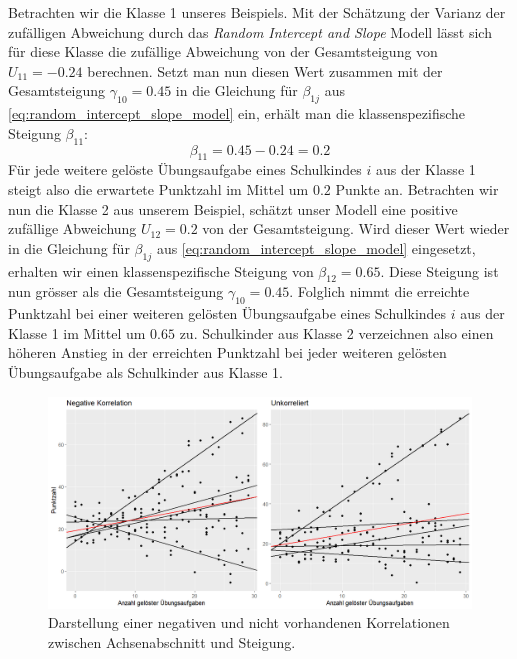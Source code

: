 \documentclass[12pt, a4paper]{article}\usepackage[]{graphicx}\usepackage[]{color}
\begin{document}
Betrachten wir die Klasse 1 unseres Beispiels. Mit der Schätzung der Varianz der zufälligen Abweichung durch das \textit{Random Intercept and Slope} Modell lässt sich für diese Klasse die zufällige Abweichung von der Gesamtsteigung von $U_{11} = -0.24$ berechnen. Setzt man nun diesen Wert zusammen mit der Gesamtsteigung $\gamma_{10} = 0.45$ in die Gleichung für $\beta_{1j}$ aus \eqref{eq:random_intercept_slope_model} ein, erhält man die klassenspezifische Steigung $\beta_{11}$:
\begin{equation} \label{eq:beta1_example}	
\beta_{11} = 0.45 - 0.24 = 0.2
\end{equation} 
Für jede weitere gelöste Übungsaufgabe eines Schulkindes $i$ aus der Klasse 1 steigt also die erwartete Punktzahl im Mittel um $0.2$ Punkte an. Betrachten wir nun die Klasse 2 aus unserem Beispiel, schätzt unser Modell eine positive zufällige Abweichung $U_{12} = 0.2$ von der Gesamtsteigung. Wird dieser Wert wieder in die Gleichung für $\beta_{1j}$ aus \eqref{eq:random_intercept_slope_model} eingesetzt, erhalten wir einen klassenspezifische Steigung von $\beta_{12} = 0.65$. Diese Steigung ist nun grösser als die Gesamtsteigung $\gamma_{10} = 0.45$. Folglich nimmt die erreichte Punktzahl bei einer weiteren gelösten Übungsaufgabe eines Schulkindes $i$ aus der Klasse 1 im Mittel um $0.65$ zu. Schulkinder aus Klasse 2 verzeichnen also einen höheren Anstieg in der erreichten Punktzahl bei jeder weiteren gelösten Übungsaufgabe als Schulkinder aus Klasse 1. 

\begin{figure}[b!]
\centering
\includegraphics[width = \textwidth]{./figures/corr_s_i}
\caption{Darstellung einer negativen und nicht vorhandenen Korrelationen zwischen Achsenabschnitt und Steigung.}
\label{fig:corr_s_i}
\end{figure}
\end{document}
